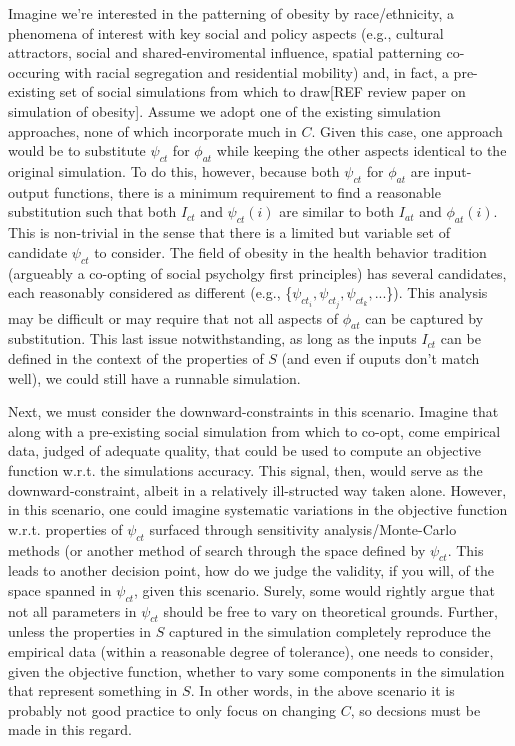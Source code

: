 \documentclass{article}
\begin{document}
Imagine we're interested in the patterning of obesity by race/ethnicity, a phenomena of interest with key social and policy aspects (e.g., cultural attractors, social and shared-enviromental influence, spatial patterning co-occuring with racial segregation and residential mobility) and, in fact, a pre-existing set of social simulations from which to draw[REF review paper on simulation of obesity].  Assume we adopt one of the existing simulation approaches, none of which incorporate much in $C$.  Given this case, one approach would be to substitute $\psi_{ct}$ for $\phi_{at}$ while keeping the other aspects identical to the original simulation. To do this, however, because both $\psi_{ct}$ for $\phi_{at}$ are input-output functions, there is a minimum requirement to find a reasonable substitution such that both $I_{ct}$ and $\psi_{ct}(i)$ are similar to both $I_{at}$ and $\phi_{at}(i)$.  This is non-trivial in the sense that there is a limited but variable set of candidate $\psi_{ct}$ to consider.  The field of obesity in the health behavior tradition (argueably a co-opting of social psycholgy first principles) has several candidates, each reasonably considered as different (e.g., \{$\psi_{ct_i}, \psi_{ct_j}, \psi_{ct_k},...$\}).  This analysis may be difficult or may require that not all aspects of $\phi_{at}$ can be captured by substitution.  This last issue notwithstanding, as long as the inputs $I_{ct}$ can be defined in the context of the properties of $S$ (and even if ouputs don't match well), we could still have a runnable simulation.  

Next, we must consider the downward-constraints in this scenario.  Imagine that along with a pre-existing social simulation from which to co-opt, come empirical data, judged of adequate quality, that could be used to compute an objective function w.r.t. the simulations accuracy.  This signal, then, would serve as the downward-constraint, albeit in a relatively ill-structed way taken alone.  However, in this scenario, one could imagine systematic variations in the objective function w.r.t. properties of $\psi_{ct}$ surfaced through sensitivity analysis/Monte-Carlo methods (or another method of search through the space defined by $\psi_{ct}$.  This leads to another decision point, how do we judge the validity, if you will, of the space spanned in $\psi_{ct}$, given this scenario.  Surely, some would rightly argue that not all parameters in $\psi_{ct}$ should be free to vary on theoretical grounds\cite{accountable modeling}.  Further, unless the properties in $S$ captured in the simulation completely reproduce the empirical data (within a reasonable degree of tolerance), one needs to consider, given the objective function, whether to vary some components in the simulation that represent something in $S$.  In other words, in the above scenario it is probably not good practice to only focus on changing $C$, so decsions must be made in this regard.
\end{document}
